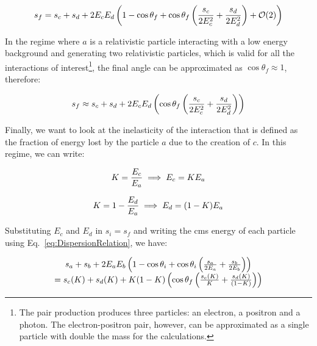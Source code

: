 \documentclass[a4paper]{jpconf}
\begin{document}
\begin{equation}
\centering
s_{f} = s_{c} + s_{d} + 2 E_{c} E_{d} \left(1 - \cos{\theta_{f}} + \cos{\theta_{f}} \left(\frac{s_{c}}{2 E^{2}_{c}} + \frac{s_{d}}{2 E^{2}_{d}}\right) + \mathcal{O}(2) \right)
\end{equation}

In the regime where $a$ is a relativistic particle interacting with a low energy background and generating two relativistic particles, which is valid for all the interactions of interest\footnote{The pair production produces three particles: an electron, a positron and a photon. The electron-positron pair, however, can be approximated as a single particle with double the mass for the calculations.}, the final angle can be approximated as $\cos{\theta_{f}} \approx 1$, therefore:

\begin{equation}
\centering
s_{f} \approx s_{c} + s_{d} + 2 E_{c} E_{d} \left(\cos{\theta_{f}} \left(\frac{s_{c}}{2 E^{2}_{c}} + \frac{s_{d}}{2 E^{2}_{d}}\right)\right)
\end{equation}

Finally, we want to look at the inelasticity of the interaction that is defined as the fraction of energy lost by the particle $a$ due to the creation of $c$. In this regime, we can write:

\begin{equation}
\centering
K = \frac{E_{c}}{E_{a}} \implies E_{c} = K E_{a}
\end{equation}

\begin{equation}
\centering
K = 1 - \frac{E_{d}}{E_{a}} \implies E_{d} = (1-K) E_{a}
\end{equation}

Substituting $E_{c}$ and $E_{d}$ in $s_{i} = s_{f}$ and writing the cms energy of each particle using Eq.~\ref{eq:DispersionRelation}, we have:

\begin{equation}
\centering
\begin{array}{c}
s_{a} + s_{b} + 2 E_{a} E_{b} \left(1 - \cos{\theta_{i}} + \cos{\theta_{i}} \left(\frac{s_{a}}{2 E_{a}} + \frac{s_{b}}{2 E_{b}}\right)\right) \\ = s_{c} (K) + s_{d} (K) + K (1-K) \left(\cos{\theta_{f}} \left(\frac{s_{c} (K)}{K} + \frac{s_{d} (K)}{(1-K)}\right) \right)
\end{array}
\end{equation}
\end{document}
